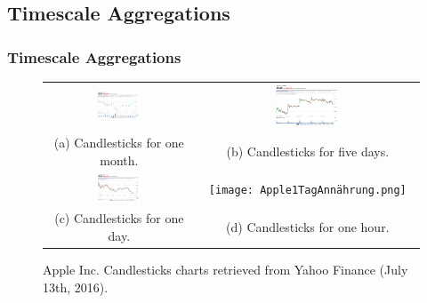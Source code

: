 \documentclass{beamer}
\begin{document}
\subsection{Timescale Aggregations}
\begin{frame}
\frametitle{Timescale Aggregations}
\begin{figure}
    \centering
		\begin{tabular}{c c}
        \includegraphics[width=0.3\textwidth,height=0.3\textwidth]{AppleMonatJun2016.png} &
        \includegraphics[width=0.3\textwidth,height=0.3\textwidth]{Apple5TageJun2016.png} \\
    \scriptsize (a) Candlesticks for one month. & \scriptsize (b) Candlesticks for five days.\\		
        \includegraphics[width=0.3\textwidth,height=0.3\textwidth]{Apple1TagJun2016.png} &
        \texttt{[image: Apple1TagAnnährung.png]} \\
    \scriptsize (c) Candlesticks for one day. & \scriptsize (d) Candlesticks for one hour. \\
		\end{tabular}	
    \caption{Apple Inc. Candlesticks charts retrieved from Yahoo Finance (July 13th, 2016).}\label{fig:TrendHA}
\end{figure}
\end{frame}
\end{document}
